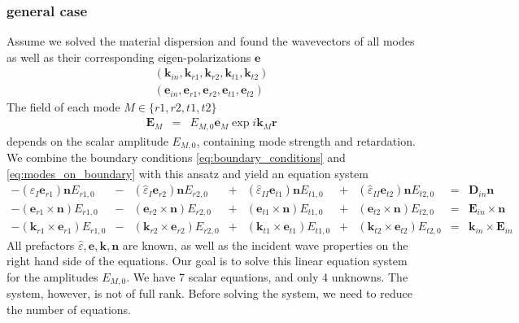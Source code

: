 \documentclass[12pt,a4paper,twoside,openright,BCOR10mm,headsepline,titlepage,abstracton,chapterprefix,final]{scrreprt}
\newcommand\Vector[1]{{\mathbf{#1}}}
\newcommand\Location{\Vector{r}}
\newcommand\wavenumber{k}
\newcommand\Wavevector{\Vector{\wavenumber}}
\newcommand\Tensor[1]{\hat{#1}}
\newcommand\scalarEfield{E}
\newcommand\scalarDfield{D}
\newcommand\Efield{\Vector{\scalarEfield}}
\newcommand\Dfield{\Vector{\scalarDfield}}
\newcommand\permittivity{\Tensor{\scalarpermittivity}}
\newcommand\scalarpermittivity{\varepsilon}
\newcommand\materialone{I}
\newcommand\materialtwo{{II}}
\begin{document}
\subsubsection{general case}
Assume we solved the material dispersion and found the wavevectors of all modes as well as their corresponding eigen-polarizations $\Vector{e}$
\begin{subequations}
\begin{eqnarray}
(\Wavevector_{in}, \Wavevector_{r1}, \Wavevector_{r2}, \Wavevector_{t1}, \Wavevector_{t2}) \\
(\Vector{e}_{in}, \Vector{e}_{r1}, \Vector{e}_{r2}, \Vector{e}_{t1}, \Vector{e}_{t2})
\end{eqnarray}
\end{subequations}
The field of each mode $M \in \{ r1, r2, t1, t2 \}$
\begin{eqnarray}
\Efield_{M} &=& E_{M,0} \Vector{e}_{M} \exp{i \Wavevector_M \Location}
\end{eqnarray}
depends on the scalar amplitude $E_{M,0}$, containing mode strength and retardation.
We combine the boundary conditions \ref{eq:boundary_conditions} and \ref{eq:modes_on_boundary} with this ansatz and yield an equation system
\begingroup \small
\begin{subequations}
\begin{align}
   - ( \permittivity_\materialone \Vector{e}_{r1}) \Vector{n} E_{r1,0} &-& ( \permittivity_\materialone \Vector{e}_{r2}) \Vector{n} E_{r2,0} &+& ( \permittivity_\materialtwo \Vector{e}_{t1} ) \Vector{n} E_{t1,0} &+& ( \permittivity_\materialtwo \Vector{e}_{t2} ) \Vector{n} E_{t2,0} &=& \Dfield_{in} \Vector{n} \label{eq:fresneldn}\\
   - ( \Vector{e}_{r1} \times \Vector{n} )         E_{r1,0} &-& ( \Vector{e}_{r2} \times \Vector{n} )         E_{r2,0} &+& ( \Vector{e}_{t1} \times \Vector{n} )          E_{t1,0} &+& ( \Vector{e}_{t2} \times \Vector{n} )          E_{t2,0} &=& \Efield_{in} \times \Vector{n} \label{eq:fresnelEcrossn} \\
   - ( \Wavevector_{r1} \times \Vector{e}_{r1} )   E_{r1,0} &-& ( \Wavevector_{r2} \times \Vector{e}_{r2} )   E_{r2,0} &+& ( \Wavevector_{t1} \times \Vector{e}_{t1} )    E_{t1,0} &+& ( \Wavevector_{t2} \times \Vector{e}_{t2} )    E_{t2,0} &=& \Wavevector_{in} \times \Efield_{in} \label{eq:fresnelkE}
\end{align}
\end{subequations}
\endgroup
All prefactors $\permittivity, \Vector{e}, \Wavevector, \Vector{n}$ are known, 
as well as the incident wave properties on the right hand side of the equations.
Our goal is to solve this linear equation system for the amplitudes $E_{M,0}$.
We have 7 scalar equations, and only 4 unknowns.
The system, however, is not of full rank.
Before solving the system, we need to reduce the number of equations.
\end{document}
